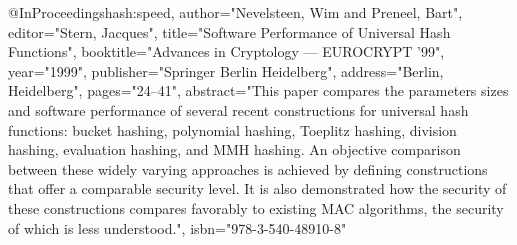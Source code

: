 @InProceedings{hash:speed,
author="Nevelsteen, Wim
and Preneel, Bart",
editor="Stern, Jacques",
title="Software Performance of Universal Hash Functions",
booktitle="Advances in Cryptology --- EUROCRYPT '99",
year="1999",
publisher="Springer Berlin Heidelberg",
address="Berlin, Heidelberg",
pages="24--41",
abstract="This paper compares the parameters sizes and software performance of several recent constructions for universal hash functions: bucket hashing, polynomial hashing, Toeplitz hashing, division hashing, evaluation hashing, and MMH hashing. An objective comparison between these widely varying approaches is achieved by defining constructions that offer a comparable security level. It is also demonstrated how the security of these constructions compares favorably to existing MAC algorithms, the security of which is less understood.",
isbn="978-3-540-48910-8"
}

